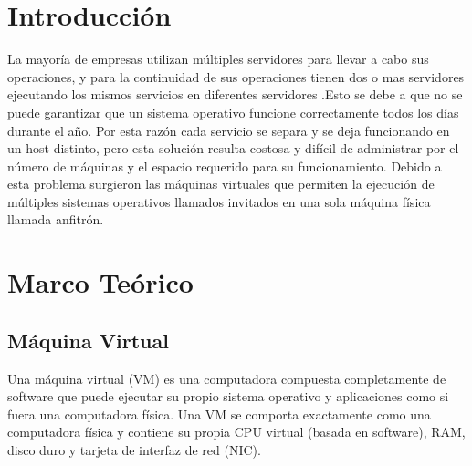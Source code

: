 \documentclass[preprint,12pt]{elsarticle}
\begin{document}



\section{Introducción}

La mayoría de empresas utilizan múltiples servidores para llevar a cabo sus operaciones, y para la continuidad de sus operaciones tienen dos o mas servidores ejecutando los mismos servicios en diferentes servidores .Esto se debe a que no se puede garantizar que un sistema operativo funcione correctamente todos los días durante el año. Por esta razón cada servicio se separa y se deja funcionando en un host distinto, pero esta solución resulta costosa y difícil de administrar por el número de máquinas y el espacio requerido para su funcionamiento.
Debido a esta problema surgieron las máquinas virtuales que permiten la ejecución de múltiples sistemas operativos llamados invitados en una sola máquina física llamada anfitrón.  






\section{Marco Teórico}


\subsection {\textbf{Máquina Virtual}}
Una máquina virtual (VM) es una computadora compuesta completamente de software que puede ejecutar su propio sistema operativo y aplicaciones como si fuera una computadora física. Una VM se comporta exactamente como una computadora física y contiene su propia CPU virtual (basada en software), RAM, disco duro y tarjeta de interfaz de red (NIC).\cite{Citrix2018}
\end{document}
